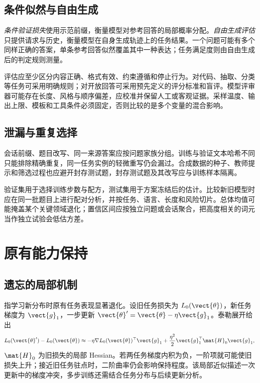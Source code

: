 \documentclass[../textbook.tex]{subfiles}
\begin{document}
\subsection{条件似然与自由生成}
\emph{条件验证损失}使用示范前缀，衡量模型对参考回答的局部概率分配。\emph{自由生成评估}只提供请求与历史，衡量模型在自身生成轨迹上的任务结果。一个问题可能有多个同样正确的答案，单条参考回答似然覆盖其中一种表达；任务满足度则由自由生成后的判定规则测量。

评估应至少区分内容正确、格式有效、约束遵循和停止行为。对代码、抽取、分类等任务可采用明确规则；对开放回答可采用预先定义的评分标准和盲评。模型评审器可能存在长度、风格与顺序偏差，应校准并保留人工或客观证据。采样温度、输出上限、模板和工具条件必须固定，否则比较的是多个变量的混合影响。

\subsection{泄漏与重复选择}
会话前缀、题目改写、同一来源答案应按问题家族分组。训练与验证文本哈希不同只能排除精确重复，同一任务实例的轻微重写仍会漏过。合成数据的种子、教师提示和筛选过程也应避开封存测试题，封存测试题及其改写应与训练样本隔离。

验证集用于选择训练步数与配方，测试集用于方案冻结后的估计。比较新旧模型时应在同一批题目上进行配对分析，并按任务、语言、长度和风险切片。总体均值可能掩盖某个关键领域退化；置信区间应按独立问题或会话聚合，把高度相关的词元当作独立试验会低估方差。

\section{原有能力保持}

\subsection{遗忘的局部机制}
指学习新分布时原有任务表现显著退化。设旧任务损失为 $L_0(\vect{\theta})$，新任务梯度为 $\vect{g}_1$，一步更新 $\vect{\theta}'=\vect{\theta}-\eta \vect{g}_1$。泰勒展开给出
\begin{equation}
 L_0(\vect{\theta}')-L_0(\vect{\theta})
 \approx-\eta\nabla L_0(\vect{\theta})^\top \vect{g}_1
 +\frac{\eta^2}{2}\vect{g}_1^\top \mat{H}_0\vect{g}_1,
 \label{eq:sft-forgetting}
\end{equation}
$\mat{H}_0$ 为旧损失的局部 Hessian。若两任务梯度内积为负，一阶项就可能使旧损失上升；接近旧任务驻点时，二阶曲率仍会影响保持程度。该局部近似描述一次更新中的梯度冲突，多步训练还需结合任务分布与后续更新分析。
\end{document}
